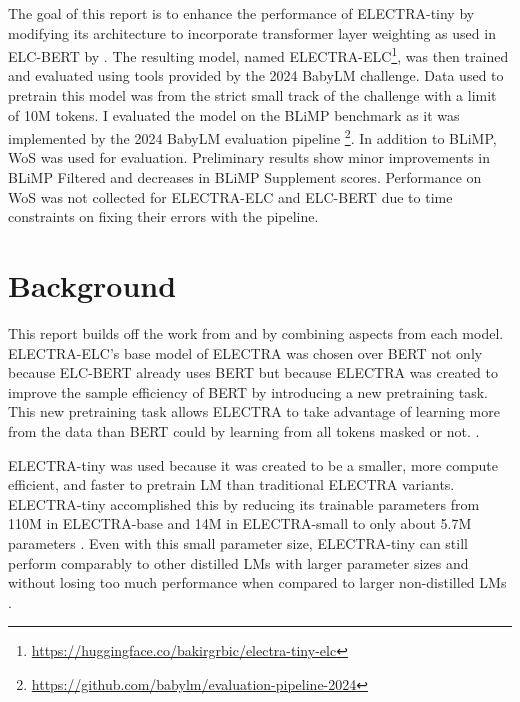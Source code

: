 \documentclass[11pt]{article}
\begin{document}
The goal of this report is to enhance the performance of ELECTRA-tiny by modifying its 
architecture to incorporate transformer layer weighting as used in ELC-BERT by 
\citet{charpentier2023layersequallyimportantlayer}. The resulting model, named 
ELECTRA-ELC\footnote{\url{https://huggingface.co/bakirgrbic/electra-tiny-elc}}, was
then trained and evaluated using tools provided by the 2024 BabyLM challenge.
Data used to pretrain this model was from the 
strict small track of the challenge with a limit of 10M tokens. 
I evaluated the model on the BLiMP benchmark \cite{warstadt2023blimpbenchmarklinguisticminimal}
as it was implemented  
by the 2024 BabyLM evaluation pipeline \footnote{\url{https://github.com/babylm/evaluation-pipeline-2024}}. In addition to BLiMP, 
WoS was used for 
evaluation. Preliminary results show minor improvements in BLiMP Filtered and decreases
in BLiMP Supplement scores. Performance on WoS was not collected for ELECTRA-ELC and 
ELC-BERT due to time constraints on fixing their errors with the pipeline.


\section{Background}

This report builds off the work from \citet{fields-kennington-2023-exploring} and
\citet{charpentier2023layersequallyimportantlayer} by combining aspects from each model. 
ELECTRA-ELC's base model of ELECTRA was chosen over BERT not only because ELC-BERT already
uses BERT but because ELECTRA was created to improve the sample efficiency of BERT by 
introducing a new pretraining task.
This new pretraining task allows ELECTRA to take advantage of
learning more from the data than BERT could by learning from all tokens masked or not.
\cite{clark2020electrapretrainingtextencoders}.

ELECTRA-tiny was used because it was created to be a smaller, more compute efficient, and
faster to pretrain LM than
traditional ELECTRA variants. ELECTRA-tiny accomplished this by reducing its trainable 
parameters from 110M in ELECTRA-base and 14M in ELECTRA-small
\cite{clark2020electrapretrainingtextencoders}
to only about 5.7M parameters \cite{fields-kennington-2023-exploring}. Even with this 
small parameter size, ELECTRA-tiny can still perform comparably to other distilled LMs with 
larger
parameter sizes and without losing too much performance when compared to larger non-distilled LMs \cite{fields-kennington-2023-exploring}.
\end{document}
